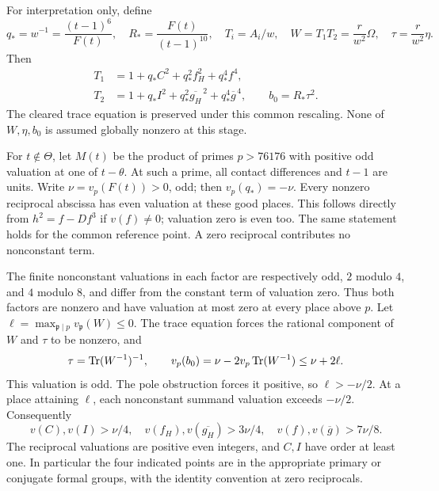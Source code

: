 \documentclass[11pt,a4paper]{article}
\begin{document}
For interpretation only, define
\[
 q_* =w^{-1}=\frac{(t-1)^6}{F(t)},\quad
 R_* =\frac{F(t)}{(t-1)^{10}},\quad
 T_i=A_i/w,\quad W=T_1T_2=\frac r{w^2}\Omega,
 \quad\tau=\frac r{w^2}\eta.
\]
Then
\begin{align*}
T_1&=1+q_*C^2+q_*^2 f_H^2+q_*^4f^4,\\
T_2&=1+q_*I^2+q_*^2\overline{g_H}^{\,2}+q_*^4\overline g^{\,4},
\qquad b_0=R_*\tau^2.
\end{align*}
The cleared trace equation is preserved under this common rescaling.
None of $W,\eta,b_0$ is assumed globally nonzero at this stage.

For $t\notin\Theta$, let $M(t)$ be the product of primes $p>76176$
with positive odd valuation at one of $t-\theta$. At such a prime,
all contact differences and $t-1$ are units. Write
$\nu=v_p(F(t))>0$, odd; then $v_p(q_*)=-\nu$.
Every nonzero reciprocal abscissa has even valuation at these good
places. This follows directly from $h^2=f-Df^3$ if $v(f)\ne0$;
valuation zero is even too. The same statement holds for the common
reference point. A zero reciprocal contributes no nonconstant term.

The finite nonconstant valuations in each factor are respectively
odd, $2$ modulo $4$, and $4$ modulo $8$, and differ from the
constant term of valuation zero. Thus both factors are nonzero and
have valuation at most zero at every place above $p$. Let
$\ell=\max_{\mathfrak p\mid p}v_{\mathfrak p}(W)\le0$.
The trace equation forces the rational component of $W$ and $\tau$
to be nonzero, and
\[
 \tau=\operatorname{Tr}(W^{-1})^{-1},\qquad
 v_p(b_0)=\nu-2v_p\operatorname{Tr}(W^{-1})\le\nu+2\ell.
\]
This valuation is odd. The pole obstruction forces it positive, so
$\ell>-\nu/2$. At a place attaining $\ell$, each nonconstant
summand valuation exceeds $-\nu/2$. Consequently
\[
 v(C),v(I)>\nu/4,\quad
 v(f_H),v(\overline{g_H})>3\nu/4,\quad
 v(f),v(\overline g)>7\nu/8.
\]
The reciprocal valuations are positive even integers, and $C,I$
have order at least one. In particular the four indicated points are
in the appropriate primary or conjugate formal groups, with the
identity convention at zero reciprocals.
\end{document}
